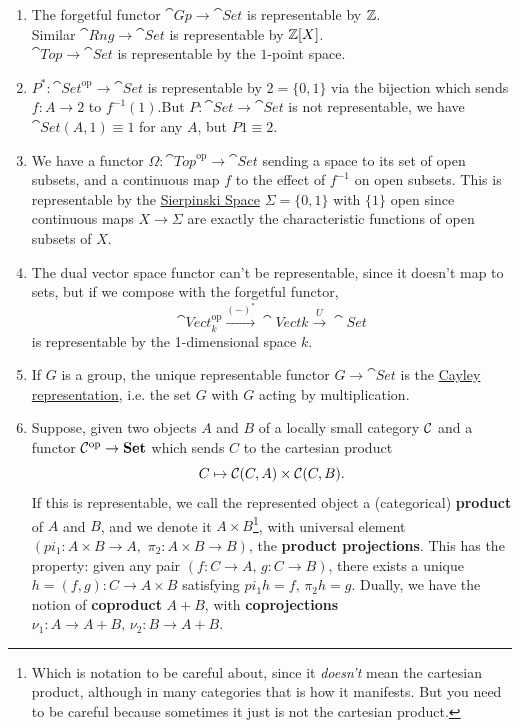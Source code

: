 \documentclass{article}
\begin{document}
\begin{ex} \newlec 
    \begin{enumerate}
        \item[(a)] The forgetful functor $\cat{Gp} \to \cat{Set}$ is representable by $\mathbb{Z}$.\\ Similar $\cat{Rng} \to \cat{Set}$ is representable by $\mathbb{Z}[X]$.\\ $\cat{Top} \to \cat{Set}$ is representable by the $1$-point space.
        \item[(b)] $P^{*} : \cat{Set}^{\text{op}} \to \cat{Set}$ is representable by $2=\{0,1\}$ via the bijection which sends $f:A \to 2$ to $f^{-1}(1)$.\gap But $P : \cat{Set} \to \cat{Set}$ is not representable, we have $\cat{Set}(A,1) \equiv 1$ for any $A$, but $P1 \equiv 2$.
        \item[(c)] We have a functor $\Omega : \cat{Top}^{\text{op}} \to \cat{Set}$ sending a space to its set of open subsets, and a continuous map $f$ to the effect of $f^{-1}$ on open subsets. This is representable by the \underline{Sierpinski Space} $\Sigma = \{0,1\}$ with $\{1\}$ open since continuous maps $X \to \Sigma$ are exactly the characteristic functions of open subsets of $X$.
        \item[(d)] The dual vector space functor can't be representable, since it doesn't map to sets, but if we compose with the forgetful functor, \[ \cat{Vect}_{k}^{\text{op}} \xrightarrow{(-)^{*}} \cat{Vect}{k} \xrightarrow{U} \cat{Set}\] is representable by the 1-dimensional space $k$.
        \item[(e)] If $G$ is a group, the unique representable functor $G \to \cat{Set}$ is the \underline{Cayley representation}, i.e. the set $G$ with $G$ acting by multiplication.
        \item[(f)] Suppose, given two objects $A$ and $B$ of a locally small category $\mathcal{C}$ and a functor $\mathcal{C}^{\text{op}} \to \textbf{Set}$ which sends $C$ to the cartesian product \[ C \mapsto \mathcal{C}(C,A) \times \mathcal{C}(C,B).\] If this is representable, we call the represented object a (categorical) \textbf{product} of $A$ and $B$, and we denote it $A \times B$\footnote{Which is notation to be careful about, since it \textit{doesn't} mean the cartesian product, although in many categories that is how it manifests. But you need to be careful because sometimes it just is not the cartesian product.}, with universal element $(pi_{1}: A \times B \to A, \,\, \pi_{2} : A \times B \to B)$, the \textbf{product projections}. This has the property: given any pair $(f:C \to A, \, g: C \to B)$, there exists a unique $h=(f,g) : C \to A \times B$ satisfying $pi_{1}h = f, \, \pi_{2}h=g.$ \gap Dually, we have the notion of \textbf{coproduct} $A + B$, with \textbf{coprojections} $\nu_{1} : A \to A+B, \, \nu_{2} : B \to A+B.$

\end{enumerate}
\end{ex}
\end{document}
